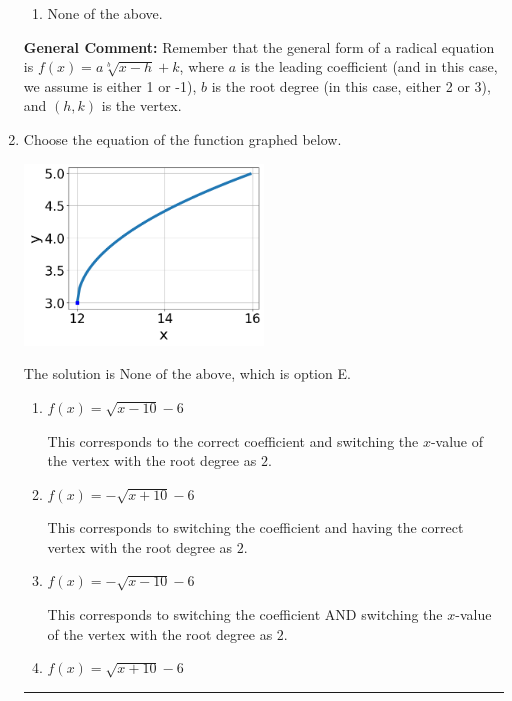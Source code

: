 \documentclass{extbook}[14pt]
\newcommand{\litem}[1]{\item #1

\rule{\textwidth}{0.4pt}}
\begin{document}
\begin{enumerate}
{\begin{enumerate}[label=\Alph*.]
\item None of the above.\end{enumerate}
\textbf{General Comment:} Remember that the general form of a radical equation is $ f(x) = a \sqrt[b]{x - h} + k $, where $a$ is the leading coefficient (and in this case, we assume is either 1 or -1), $b$ is the root degree (in this case, either 2 or 3), and $(h, k)$ is the vertex.
}
\litem{
Choose the equation of the function graphed below.

\begin{center}
    \includegraphics[width=0.5\textwidth]{../Figures/radicalGraphToEquationCopyB.png}
\end{center}


The solution is \( \text{None of the above} \), which is option E.\begin{enumerate}[label=\Alph*.]
\item \( f(x) = \sqrt{x - 10} - 6 \)

This corresponds to the correct coefficient and switching the $x$-value of the vertex with the root degree as $2$.
\item \( f(x) = - \sqrt{x + 10} - 6 \)

This corresponds to switching the coefficient and having the correct vertex with the root degree as $2$.
\item \( f(x) = - \sqrt{x - 10} - 6 \)

This corresponds to switching the coefficient AND switching the $x$-value of the vertex with the root degree as $2$.
\item \( f(x) = \sqrt{x + 10} - 6 \)


\end{enumerate}}
\end{enumerate}
\end{document}

